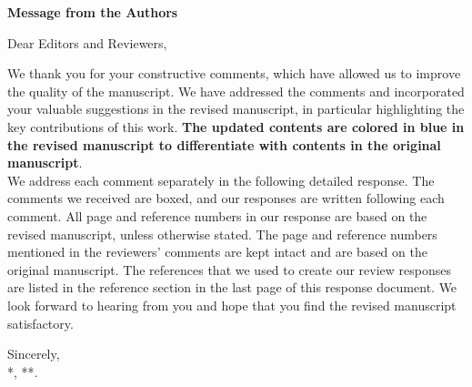 \begin{center}
{\LARGE \textbf{Message from the Authors} \par}
\end{center}
\vskip 0.2in

\noindent Dear Editors and Reviewers,

\vskip 0.1in

\noindent We thank you for your constructive comments, which have allowed us to improve the quality of the manuscript. We have addressed the comments and incorporated your valuable suggestions in the revised manuscript, in particular highlighting the key contributions of this work. \textbf{The updated contents are colored in blue in the revised manuscript to differentiate with contents in the original manuscript}. \\

\noindent We address each comment separately in the following detailed response. The comments we received are boxed, and our responses are written following each comment. All page and reference numbers in our response are based on the revised manuscript, unless otherwise stated. The page and reference numbers mentioned in the reviewers' comments are kept intact and are based on the original manuscript. The references that we used to create our review responses are listed in the reference section in the last page of this response document. We look forward to hearing from you and hope that you find the revised manuscript satisfactory.
\vskip 0.2in

\noindent Sincerely, \\
\noindent **, **.

